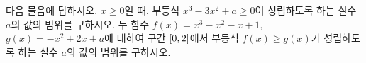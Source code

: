 다음 물음에 답하시오.
 $x\ge 0$일 때, 부등식 $x^3-3x^2+a\ge 0$이 성립하도록 하는 실수 $a$의 값의 범위를 구하시오.
 두 함수 $f(x)=x^3-x^2-x+1$, $g(x)=-x^2+2x+a$에 대하여 구간 $[0{,}\mkern3mu\mathopen{}2]$에서 부등식 $f(x)\ge g(x)$가 성립하도록 하는 실수 $a$의 값의 범위를 구하시오.
